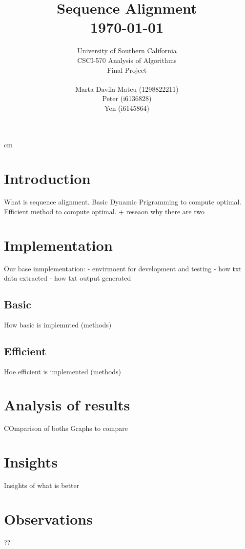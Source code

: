 \documentclass[10pt, a4paper, titlepage, onecolumn]{article}
\begin{document}
\title{ \textbf{{ Sequence Alignment}}
		\\ [0.5cm]
		\normalsize \today \vspace*{5\baselineskip}}

\date{}
 cm
\author{
        University of Southern California \\
        CSCI-570 Analysis of Algorithms\\
        Final Project \\
        \bigskip
        \bigskip
        \bigskip
        \\
        Marta Davila Mateu (1298822211)\\
        Peter (i6136828)\\
        Yen (i6145864)\\     
}
\begin{figure}
\centering
\end{figure}
\maketitle

{\tableofcontents}
\newpage



\maketitle

\section{Introduction}
What is sequence alignment.
Basic Dynamic Prigramming to compute optimal. 
Efficient method to compute optimal. + reseaon why there are two

\section{Implementation}
Our base inmplementation:
- envirmoent for development and testing
- how txt data extracted
- how txt output generated

\subsection{Basic}
How basic is implemnted (methods)

\subsection{Efficient}
Hoe efficient is implemented (methods)

\section{Analysis of results}
COmparison of boths
Graphs to compare

\section{Insights}
Insights of what is better

\section{Observations}
??
\end{document}
